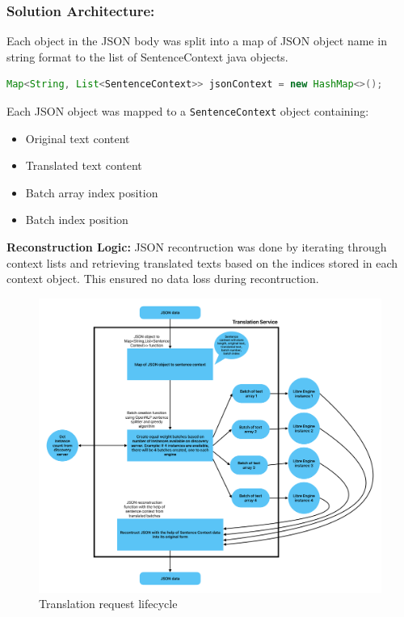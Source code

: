 \subsubsection{Solution Architecture:}

Each object in the JSON body was split into a map of JSON object name in string format to the list of SentenceContext java objects.

\begin{lstlisting}[language=Java]
Map<String, List<SentenceContext>> jsonContext = new HashMap<>();
\end{lstlisting}

Each JSON object was mapped to a \texttt{SentenceContext} object containing:
\begin{itemize}
    \item Original text content
    \item Translated text content
    \item Batch array index position
    \item Batch index position
\end{itemize}

\textbf{Reconstruction Logic:} JSON recontruction was done by iterating through context lists and retrieving translated texts based on the indices stored in each context object. This ensured no data loss during recontruction.

\begin{figure}[H]
    \centering
    \includegraphics[width=1\linewidth]{images/Backend_Documents/Translation_Service.pdf}
    \caption{Translation request lifecycle}
    \label{fig:translation_engine_radar}
\end{figure}